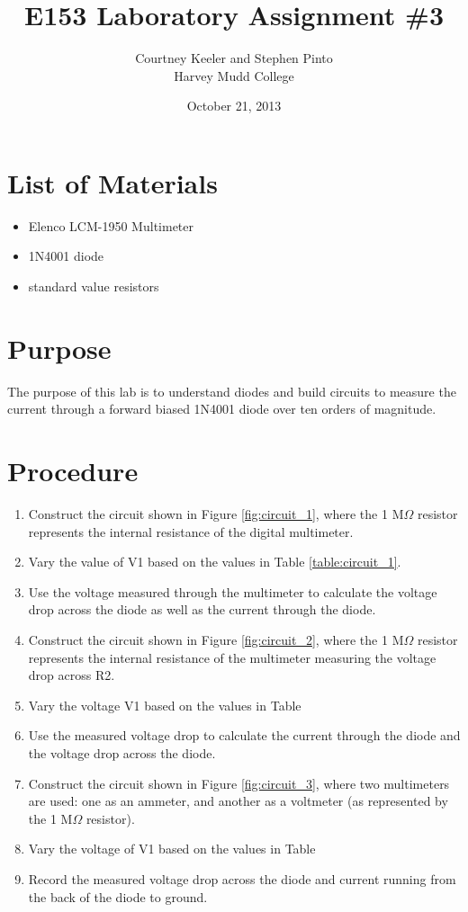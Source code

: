 \documentclass[12pt,letterpaper]{report}
\begin{document}
\title{E153 Laboratory Assignment \#3}
\author{Courtney Keeler and Stephen Pinto\\
Harvey Mudd College}
\date{October 21, 2013}
\maketitle

\section*{List of Materials}
\begin{itemize}
	\item Elenco LCM-1950 Multimeter
	\item 1N4001 diode
	\item standard value resistors
\end{itemize}

\section*{Purpose}
The purpose of this lab is to understand diodes and build circuits to measure the current through  a forward biased 1N4001 diode over ten orders of magnitude.

\section*{Procedure}

\begin{enumerate}
\item Construct the circuit shown in Figure \ref{fig:circuit_1}, where the 1 M$\Omega$ resistor represents the internal resistance of the digital multimeter.
\item Vary the value of V1 based on the values in Table \ref{table:circuit_1}.
\item Use the voltage measured through the multimeter to calculate the voltage drop across the diode as well as the current through the diode.
\item Construct the circuit shown in Figure \ref{fig:circuit_2}, where the 1 M$\Omega$ resistor represents the internal resistance of the multimeter measuring the voltage drop across R2.
\item Vary the voltage V1 based on the values in Table %
\item Use the measured voltage drop to calculate the current through the diode and the voltage drop across the diode.
\item Construct the circuit shown in Figure \ref{fig:circuit_3}, where two multimeters are used: one as an ammeter, and another as a voltmeter (as represented by the 1 M$\Omega$ resistor).
\item Vary the voltage of V1 based on the values in Table %
\item Record the measured voltage drop across the diode and current running from the back of the diode to ground.
\end{enumerate}
\end{document}
